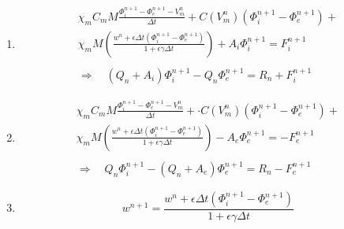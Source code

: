 \documentclass[a4paper]{article}
\begin{document}
\vspace{5mm}
\begin{enumerate}
	\item 
	\begin{equation}
	\begin{gathered}
	\chi_m C_m M \frac{	\Phi_i^{n+1}-\Phi_e^{n+1}-V_m^{n}}{\Delta t} +  C(V_m^n) (\Phi_i^{n+1}-\Phi_e^{n+1}) + \\  \chi_m M \left(\frac{w^n + \epsilon \Delta t (\Phi_i^{n+1}-\Phi_e^{n+1})}{1+\epsilon \gamma \Delta t}   \right) + A_i \Phi_i ^{n+1} = F_i^{n+1} \\ \\
     \Rightarrow \quad (Q_n + A_i) \Phi_i^{n+1} - Q_n \Phi_e^{n+1} =R_n +  F_i^{n+1}
	\end{gathered}
	\end{equation}
	
    \item 
	\begin{equation}
	\begin{gathered}
	\chi_m C_m M \frac{	\Phi_i^{n+1}-\Phi_e^{n+1}-V_m^{n}}{\Delta t} + \cdot C(V_m^n) (\Phi_i^{n+1}-\Phi_e^{n+1}) + \\   \chi_m M \left(\frac{w^n + \epsilon \Delta t (\Phi_i^{n+1}-\Phi_e^{n+1})}{1+\epsilon \gamma \Delta t}   \right) - A_e \Phi_e ^{n+1} = -F_e^{n+1} \\ \\
	\Rightarrow \quad Q_n \Phi_i^{n+1} - (Q_n+A_e) \Phi_e^{n+1} =R_n - F_e^{n+1}
	\end{gathered}
	\end{equation}
	\vspace{3mm}
	\item 
	\begin{equation}
	w^{n+1} = \frac{w^n + \epsilon \Delta t (\Phi_i^{n+1}-\Phi_e^{n+1})}{1+\epsilon \gamma \Delta t}
	\end{equation}
\end{enumerate}
\end{document}

